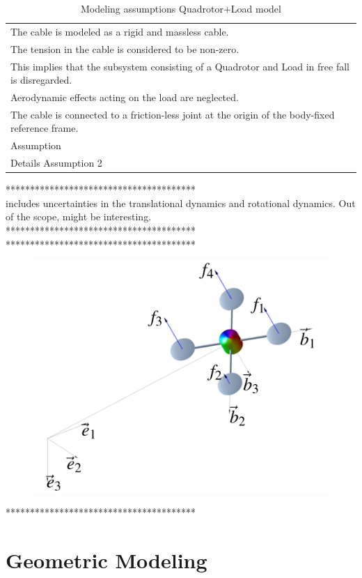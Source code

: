 \begin{table}[h!]
	\centering
	\begin{tabular}{|p{\textwidth}|}
		\hline
		\tabitem The cable is modeled as a rigid and massless cable. \\
		\tabitem The tension in the cable is considered to be non-zero.\\
		\hspace{4mm} This implies that the subsystem consisting of a Quadrotor and Load in free fall is disregarded.\\		 
		\tabitem Aerodynamic effects acting on the load are neglected.\\
		\tabitem The cable is connected to a friction-less joint at the origin of the body-fixed reference frame.\\
		\tabitem Assumption \\
		\hspace{4mm} Details Assumption 2\\
		\hline
	\end{tabular}
	\caption{Modeling assumptions Quadrotor+Load model}
	\label{tab:mod.assumptionsQRL}
\end{table}



***************************************\\
\cite{Goodarzi2013a} includes uncertainties in the translational dynamics and rotational dynamics. Out of the scope, might be interesting.\\
***************************************\\


***************************************\\
\begin{figure}[h!]
	\centering
	\includegraphics[width=.45\textwidth]{./StyleStuff/LeeQRmodel.png}
	\caption{\label{fig:}}
\end{figure}		
***************************************\\


\section{Geometric Modeling}\label{sec:mod.geometric}

